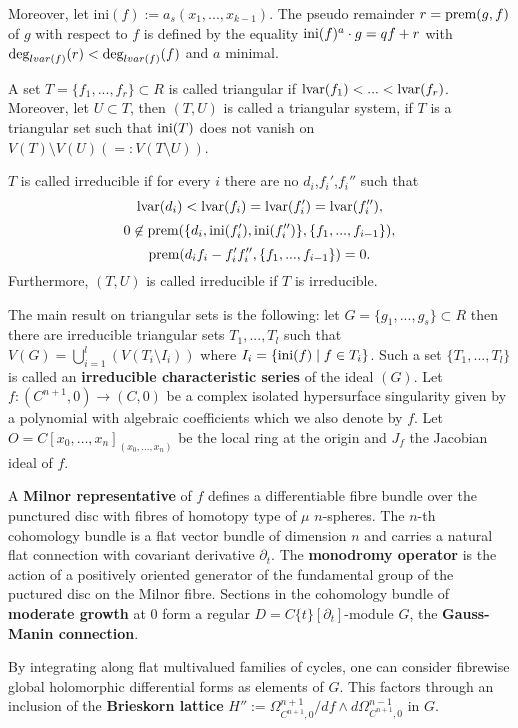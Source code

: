 Moreover, let
\hbox{ini}$(f):=a_s(x_1,...,x_{k-1})$. The pseudo remainder
$r=\hbox{prem}(g,f)$ of $g$ with respect to $f$ is
defined by the equality $\hbox{ini}(f)^a\cdot g = qf+r$ with
$\hbox{deg}_{lvar(f)}(r)<\hbox{deg}_{lvar(f)}(f)$ and $a$
minimal.

A set $T=\{f_1,...,f_r\} \subset R$ is called triangular if
$\hbox{lvar}(f_1)<...<\hbox{lvar}(f_r)$. Moreover, let $ U \subset T $,
then $(T,U)$ is called a triangular system, if $T$ is a triangular set
such that $\hbox{ini}(T)$ does not vanish on $V(T) \setminus V(U)
(=:V(T\setminus U))$.

$T$ is called irreducible if for every $i$ there are no
$d_i$,$f_i'$,$f_i''$ such that
$$   \hbox{lvar}(d_i)<\hbox{lvar}(f_i) =
\hbox{lvar}(f_i')=\hbox{lvar}(f_i''),$$
$$   0 \not\in \hbox{prem}(\{ d_i, \hbox{ini}(f_i'),
\hbox{ini}(f_i'')\},\{ f_1,...,f_{i-1}\}),$$
$$\hbox{prem}(d_if_i-f_i'f_i'',\{f_1,...,f_{i-1}\})=0.$$
Furthermore, $(T,U)$ is called irreducible if $T$ is irreducible.

The main result on triangular sets is the following:
let $G=\{g_1,...,g_s\} \subset R$ then there are irreducible triangular sets $T_1,...,T_l$
such that $V(G)=\bigcup_{i=1}^{l}(V(T_i\setminus I_i))$
where $I_i=\{\hbox{ini}(f) \mid f \in T_i \}$. Such a set
$\{T_1,...,T_l\}$ is called an {\bf irreducible characteristic series} of
the ideal $(G)$.
Let $f\colon(C^{n+1},0)\rightarrow(C,0)$ be a complex isolated hypersurface singularity given by a polynomial with algebraic coefficients which we also denote by $f$.
Let $O=C[x_0,\ldots,x_n]_{(x_0,\ldots,x_n)}$ be the local ring at the origin and $J_f$ the Jacobian ideal of $f$.

A {\bf Milnor representative} of $f$ defines a differentiable fibre bundle over the punctured disc with fibres of homotopy type of $\mu$ $n$-spheres.
The $n$-th cohomology bundle is a flat vector bundle of dimension $n$ and carries a natural flat connection with covariant derivative $\partial_t$.
The {\bf monodromy operator} is the action of a positively oriented generator of the fundamental group of the puctured disc on the Milnor fibre.
Sections in the cohomology bundle of {\bf moderate growth} at $0$ form a regular $D=C\{t\}[\partial_t]$-module $G$, the {\bf Gauss-Manin connection}.

By integrating along flat multivalued families of cycles, one can consider fibrewise global holomorphic differential forms as elements of $G$.
This factors through an inclusion of the {\bf Brieskorn lattice} $H'':=\Omega^{n+1}_{C^{n+1},0}/df\wedge d\Omega^{n-1}_{C^{n+1},0}$ in $G$.

